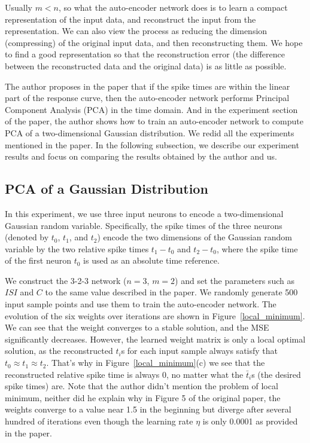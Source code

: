 Usually $m < n$, so what the auto-encoder network does is to learn a compact representation of the input data,
and reconstruct the input from the representation. 
We can also view the process as reducing the dimension (compressing) of the original input data,
and then reconstructing them.
We hope to find a good representation so that the reconstruction error (the difference between the reconstructed
data and the original data) is as little as possible.

The author proposes in the paper that if the spike times are within the linear part of the response curve,
then the auto-encoder network performs Principal Component Analysis (PCA) in the time domain.
And in the experiment section of the paper, the author shows how to train an auto-encoder network to compute PCA
of a two-dimensional Gaussian distribution.
We redid all the experiments mentioned in the paper. 
In the following subsection, 
we describe our experiment results and focus on comparing the results obtained by the author and us.

\subsection{PCA of a Gaussian Distribution}

In this experiment, we use three input neurons to encode a two-dimensional Gaussian random variable.
Specifically, the spike times of the three neurons (denoted by $t_0$, $t_1$, and $t_2$) encode the two 
dimensions of the Gaussian random variable by the two relative spike times $t_1 - t_0$ and $t_2 - t_0$, 
where the spike time of the first neuron $t_0$ is used as an absolute time reference.

We construct the 3-2-3 network ($n=3$, $m=2$) and set the parameters such as $ISI$ and $C$ to the same
value described in the paper.
We randomly generate 500 input sample points and use them to train the auto-encoder network.
The evolution of the six weights over iterations are shown in Figure~\ref{local_minimum}.
We can see that the weight converges to a stable solution, and the MSE significantly decreases.
However, the learned weight matrix is only a local optimal solution, as the reconstructed $t_i$s for each input sample
always satisfy that $t_0 \approx t_1 \approx t_2$. 
That's why in Figure~\ref{local_minimum}(c) we see that the reconstructed relative spike time is always $0$,
no matter what the $\bar t_i$s (the desired spike times) are.
Note that the author didn't mention the problem of local minimum, 
neither did he explain why in Figure 5 of the original paper, the weights converge to a value near
1.5 in the beginning but diverge after several hundred of iterations even though the learning rate $\eta$
is only 0.0001 as provided in the paper.

